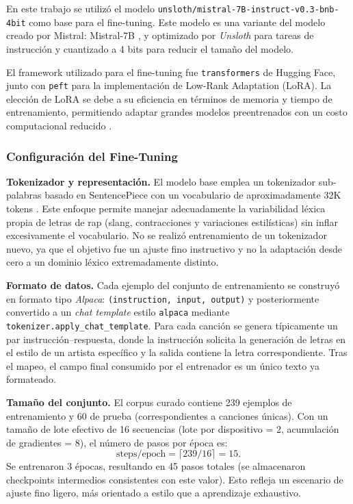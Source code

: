 \documentclass[paper=letter, fontsize=11pt, draft=false]{scrartcl}
\numberwithin{equation}{section} %
\numberwithin{figure}{section} %
\numberwithin{table}{section} %
\numberwithin{subsection}{section}
\begin{document}
En este trabajo se utilizó el modelo \texttt{unsloth/mistral-7B-instruct-v0.3-bnb-4bit} como base para el fine-tuning. Este modelo es una variante del modelo creado por Mistral: Mistral-7B \cite{jiang2023mistral7b}, y optimizado por \textit{Unsloth} para tareas de instrucción y cuantizado a 4 bits para reducir el tamaño del modelo.

El framework utilizado para el fine-tuning fue \texttt{transformers} de Hugging Face, junto con \texttt{peft} para la implementación de Low-Rank Adaptation (LoRA). La elección de LoRA se debe a su eficiencia en términos de memoria y tiempo de entrenamiento, permitiendo adaptar grandes modelos preentrenados con un costo computacional reducido \cite{hu2022lora}.

\subsubsection{Configuración del Fine-Tuning}

\textbf{Tokenizador y representación.} El modelo base emplea un tokenizador sub‐palabras basado en SentencePiece con un vocabulario de aproximadamente 32K tokens \cite{kudo2018sentencepiece}. Este enfoque permite manejar adecuadamente la variabilidad léxica propia de letras de rap (slang, contracciones y variaciones estilísticas) sin inflar excesivamente el vocabulario. No se realizó entrenamiento de un tokenizador nuevo, ya que el objetivo fue un ajuste fino instructivo y no la adaptación desde cero a un dominio léxico extremadamente distinto.

\textbf{Formato de datos.} Cada ejemplo del conjunto de entrenamiento se construyó en formato tipo \textit{Alpaca}: \texttt{(instruction, input, output)} y posteriormente convertido a un \emph{chat template} estilo \texttt{alpaca} mediante \texttt{tokenizer.apply\_chat\_template}. Para cada canción se genera típicamente un par instrucción–respuesta, donde la instrucción solicita la generación de letras en el estilo de un artista específico y la salida contiene la letra correspondiente. Tras el mapeo, el campo final consumido por el entrenador es un único texto ya formateado.

\textbf{Tamaño del conjunto.} El corpus curado contiene 239 ejemplos de entrenamiento y 60 de prueba (correspondientes a canciones únicas). Con un tamaño de lote efectivo de 16 secuencias (lote por dispositivo = 2, acumulación de gradientes = 8), el número de pasos por época es:
\[
\text{steps/epoch} = \lceil 239 / 16 \rceil = 15.
\]
Se entrenaron 3 épocas, resultando en 45 pasos totales (se almacenaron checkpoints intermedios consistentes con este valor). Esto refleja un escenario de ajuste fino ligero, más orientado a estilo que a aprendizaje exhaustivo.
\end{document}
